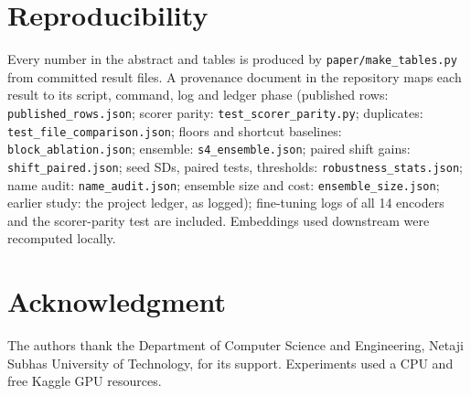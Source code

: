 \documentclass[conference]{IEEEtran}
\begin{document}
\section*{Reproducibility}
Every number in the abstract and tables is produced by \texttt{paper/make\_tables.py} from committed result files. A provenance document in the repository maps each result to its script, command, log and ledger phase (published rows: \texttt{published\_rows.json}; scorer parity: \texttt{test\_scorer\_parity.py}; duplicates: \texttt{test\_file\_comparison.json}; floors and shortcut baselines: \texttt{block\_ablation.json}; ensemble: \texttt{s4\_ensemble.json}; paired shift gains: \texttt{shift\_paired.json}; seed SDs, paired tests, thresholds: \texttt{robustness\_stats.json}; name audit: \texttt{name\_audit.json}; ensemble size and cost: \texttt{ensemble\_size.json}; earlier study: the project ledger, as logged); fine-tuning logs of all 14 encoders and the scorer-parity test are included. Embeddings used downstream were recomputed locally.

\section*{Acknowledgment}
The authors thank the Department of Computer Science and Engineering, Netaji Subhas University of Technology, for its support. Experiments used a CPU and free Kaggle GPU resources.
\end{document}
